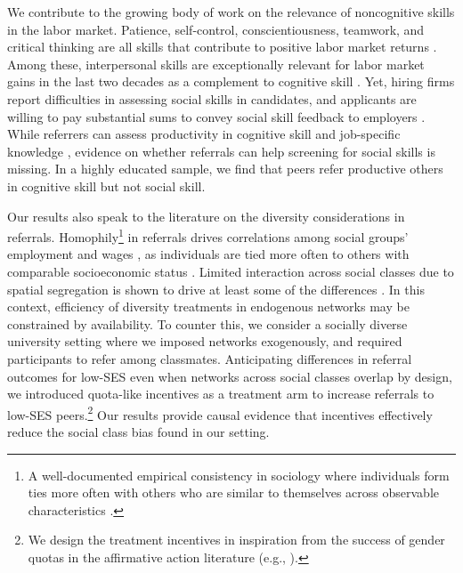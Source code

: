 \documentclass[11pt,a4paper,oneside]{article}
\begin{document}
We contribute to the growing body of work on the relevance of noncognitive skills in the labor market. Patience, self-control, conscientiousness, teamwork, and critical thinking are all skills that contribute to positive labor market returns \citep{heckman2006effects,lindqvist2011labor,heckman2012hard,weinberger2014increasing}. Among these, interpersonal skills are exceptionally relevant for labor market gains in the last two decades as a complement to cognitive skill \citep{deming2017growing,deming2023multidimensional}. Yet, hiring firms report difficulties in assessing social skills in candidates, and applicants are willing to pay substantial sums to convey social skill feedback to employers \citep{bassi2022screening}. While referrers can assess productivity in cognitive skill and job-specific knowledge \citep{beaman_who_2012,beaman_job_2018,pallais_why_2016}, evidence on whether  referrals can help screening for social skills is missing. In a highly educated sample, we find that peers refer productive others in cognitive skill but not social skill.

Our results also speak to the literature on the diversity considerations in referrals. Homophily\footnote{A well-documented empirical consistency in sociology where individuals form ties more often with others who are similar to themselves across observable characteristics \citep{mcpherson2001birds,mcpherson2006social}.} in referrals drives correlations among social groups' employment and wages \citep{calvo2004effects,calvo2007networks}, as individuals are tied more often to others with comparable socioeconomic status \citep{chetty2022social_a}. Limited interaction across social classes due to spatial segregation is shown to drive at least some of the differences \citep{chetty2022social_b}. In this context, efficiency of diversity treatments in endogenous networks may be constrained by availability. To counter this, we consider a socially diverse university setting where we imposed networks exogenously, and required participants to refer among classmates. Anticipating differences in referral outcomes for low-SES even when networks across social classes overlap by design, we introduced quota-like incentives as a treatment arm to increase referrals to low-SES peers.\footnote{We design the treatment incentives in inspiration from the success of gender quotas in the affirmative action literature (e.g., \citet{bertrand2019breaking, balafoutas2012affirmative, niederle2013costly}).} Our results provide causal evidence that incentives effectively reduce the social class bias found in our setting.
\end{document}
